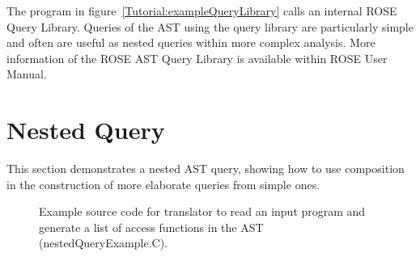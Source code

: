 
The program in figure~\ref{Tutorial:exampleQueryLibrary} calls 
an internal ROSE Query Library.  Queries of the AST using the query library are
particularly simple and often are useful as nested queries within more complex analysis.
More information of the ROSE AST Query Library is available within ROSE User Manual.


\section{Nested Query}

   This section demonstrates a nested AST query, showing how to use 
composition in the construction of more elaborate queries from simple ones.

\begin{figure}[!h]
{\indent
{\mySmallFontSize


\begin{latexonly}
   
\end{latexonly}

\begin{htmlonly}
   
\end{htmlonly}

}
}
\caption{Example source code for translator to read an input program and 
         generate a list of access functions in the AST (nestedQueryExample.C).}
\label{Tutorial:exampleNestedQuery}
\end{figure}

